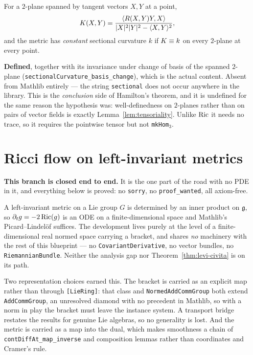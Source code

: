 \begin{definition}
  \label{def:sectional}
  \leanok
  For a $2$-plane spanned by tangent vectors $X, Y$ at a point,
  \[ K(X,Y) = \frac{\langle R(X,Y)Y, X\rangle}
       {|X|^2|Y|^2 - \langle X,Y\rangle^2}, \]
  and the metric has \emph{constant} sectional curvature $k$ if $K \equiv k$
  on every $2$-plane at every point.

  \textbf{Defined}, together with its invariance under change of basis of the
  spanned $2$-plane (\texttt{sectionalCurvature\_basis\_change}), which is the
  actual content. Absent from Mathlib entirely --- the string \texttt{sectional}
  does not occur anywhere in the library. This is the \emph{conclusion} side of
  Hamilton's theorem, and it is undefined for the same reason the hypothesis
  was: well-definedness on $2$-planes rather than on pairs of vector fields is
  exactly Lemma~\ref{lem:tensoriality}. Unlike $\operatorname{Ric}$ it needs no trace, so it
  requires the pointwise tensor but not \texttt{mkHom}$_3$.
\end{definition}

\chapter{Ricci flow on left-invariant metrics}
\label{chap:homog}

\textbf{This branch is closed end to end.} It is the one part of the road with
no PDE in it, and everything below is proved: no \texttt{sorry}, no
\texttt{proof\_wanted}, all axiom-free.

A left-invariant metric on a Lie group $G$ is determined by an inner product on
$\mathfrak{g}$, so $\partial_t g = -2\operatorname{Ric}(g)$ is an ODE on a
finite-dimensional space and Mathlib's Picard--Lindel\"of suffices. The
development lives purely at the level of a finite-dimensional real normed space
carrying a bracket, and shares \emph{no} machinery with the rest of this
blueprint --- no \texttt{CovariantDerivative}, no vector bundles, no
\texttt{RiemannianBundle}. Neither the analysis gap nor
Theorem~\ref{thm:levi-civita} is on its path.

Two representation choices earned this. The bracket is carried as an explicit
map rather than through \texttt{[LieRing]}: that class and
\texttt{NormedAddCommGroup} both extend \texttt{AddCommGroup}, an unresolved
diamond with no precedent in Mathlib, so with a norm in play the bracket must
leave the instance system. A transport bridge restates the results for genuine
Lie algebras, so no generality is lost. And the metric is carried as a map into
the dual, which makes smoothness a chain of
\texttt{contDiffAt\_map\_inverse} and composition lemmas rather than
coordinates and Cramer's rule.


